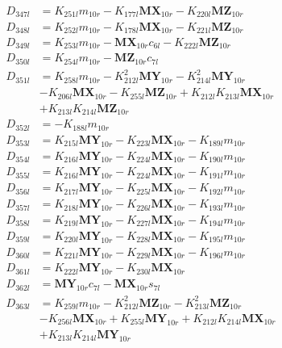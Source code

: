 \begin{multicols}{2}
\begin{align}
D_{347l} &= K_{251l}m_{10r} - K_{177l}\mathbf{MX}_{10r} - K_{220l}\mathbf{MZ}_{10r} \nonumber \\
D_{348l} &= K_{252l}m_{10r} - K_{178l}\mathbf{MX}_{10r} - K_{221l}\mathbf{MZ}_{10r} \nonumber \\
D_{349l} &= K_{253l}m_{10r} - \mathbf{MX}_{10r}c_{6l} - K_{222l}\mathbf{MZ}_{10r} \nonumber \\
D_{350l} &= K_{254l}m_{10r} - \mathbf{MZ}_{10r}c_{7l} \nonumber \\
D_{351l} &= K_{258l}m_{10r} - K_{212l}^2\mathbf{MY}_{10r} - K_{214l}^2\mathbf{MY}_{10r}  \nonumber \\
&- K_{206l}\mathbf{MX}_{10r} - K_{255l}\mathbf{MZ}_{10r} + K_{212l}K_{213l}\mathbf{MX}_{10r}  \nonumber \\
&+ K_{213l}K_{214l}\mathbf{MZ}_{10r} \nonumber \\
D_{352l} &= -K_{188l}m_{10r} \nonumber \\
D_{353l} &= K_{215l}\mathbf{MY}_{10r} - K_{223l}\mathbf{MX}_{10r} - K_{189l}m_{10r} \nonumber \\
D_{354l} &= K_{216l}\mathbf{MY}_{10r} - K_{224l}\mathbf{MX}_{10r} - K_{190l}m_{10r} \nonumber \\
D_{355l} &= K_{216l}\mathbf{MY}_{10r} - K_{224l}\mathbf{MX}_{10r} - K_{191l}m_{10r} \nonumber \\
D_{356l} &= K_{217l}\mathbf{MY}_{10r} - K_{225l}\mathbf{MX}_{10r} - K_{192l}m_{10r} \nonumber \\
D_{357l} &= K_{218l}\mathbf{MY}_{10r} - K_{226l}\mathbf{MX}_{10r} - K_{193l}m_{10r} \nonumber \\
D_{358l} &= K_{219l}\mathbf{MY}_{10r} - K_{227l}\mathbf{MX}_{10r} - K_{194l}m_{10r} \nonumber \\
D_{359l} &= K_{220l}\mathbf{MY}_{10r} - K_{228l}\mathbf{MX}_{10r} - K_{195l}m_{10r} \nonumber \\
D_{360l} &= K_{221l}\mathbf{MY}_{10r} - K_{229l}\mathbf{MX}_{10r} - K_{196l}m_{10r} \nonumber \\
D_{361l} &= K_{222l}\mathbf{MY}_{10r} - K_{230l}\mathbf{MX}_{10r} \nonumber \\
D_{362l} &= \mathbf{MY}_{10r}c_{7l} - \mathbf{MX}_{10r}s_{7l} \nonumber \\
D_{363l} &= K_{259l}m_{10r} - K_{212l}^2\mathbf{MZ}_{10r} - K_{213l}^2\mathbf{MZ}_{10r}  \nonumber \\
&- K_{256l}\mathbf{MX}_{10r} + K_{255l}\mathbf{MY}_{10r} + K_{212l}K_{214l}\mathbf{MX}_{10r}  \nonumber \\
&+ K_{213l}K_{214l}\mathbf{MY}_{10r} \nonumber \\

\end{align}
\end{multicols}
